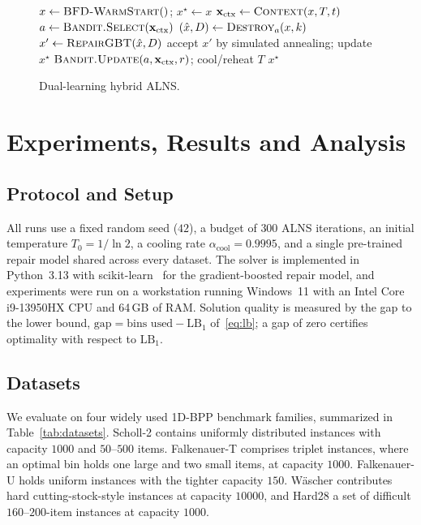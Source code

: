 \documentclass[conference]{IEEEtran}
\begin{document}
\begin{figure}[t]
	\centering
	\begin{algorithmic}[1]
		\STATE $x \leftarrow \textsc{BFD-WarmStart}()$;\; $x^\star \leftarrow x$
		\STATE $\mathbf{x}_{\text{ctx}} \leftarrow \textsc{Context}(x,T,t)$
		\STATE $a \leftarrow \textsc{Bandit.Select}(\mathbf{x}_{\text{ctx}})$
		\STATE $(\hat{x},D) \leftarrow \textsc{Destroy}_a(x,k)$
		\STATE $x' \leftarrow \textsc{RepairGBT}(\hat{x},D)$
		\STATE accept $x'$ by simulated annealing; update $x^\star$
		\STATE $\textsc{Bandit.Update}(a,\mathbf{x}_{\text{ctx}},r)$;\; cool/reheat $T$
		\ENDFOR
		\RETURN $x^\star$
	\end{algorithmic}
	\caption{Dual-learning hybrid ALNS.}
	\label{alg:alns}
\end{figure}

\section{Experiments, Results and Analysis}\label{sec:experiments}

\subsection{Protocol and Setup}
All runs use a fixed random seed ($42$), a budget of $300$ ALNS iterations, an
initial temperature $T_0=1/\ln 2$, a cooling rate $\alpha_{\mathrm{cool}}=0.9995$,
and a single pre-trained repair model shared across every dataset. The solver is
implemented in Python~3.13 with scikit-learn~\cite{bPedregosa} for the
gradient-boosted repair model, and experiments were run on a workstation running
Windows~11 with an Intel Core i9-13950HX CPU and 64\,GB of RAM. Solution quality
is measured by the gap to the
lower bound, $\text{gap}=\text{bins used}-\mathrm{LB}_1$ of~\eqref{eq:lb}; a gap of
zero certifies optimality with respect to $\mathrm{LB}_1$.

\subsection{Datasets}
We evaluate on four widely used 1D-BPP benchmark families, summarized in
Table~\ref{tab:datasets}. Scholl-2 contains uniformly distributed instances with
capacity $1000$ and $50$--$500$ items. Falkenauer-T comprises triplet instances,
where an optimal bin holds one large and two small items, at capacity $1000$.
Falkenauer-U holds uniform instances with the tighter capacity $150$. W\"ascher
contributes hard cutting-stock-style instances at capacity $10000$, and Hard28 a
set of difficult $160$--$200$-item instances at capacity $1000$.
\end{document}
